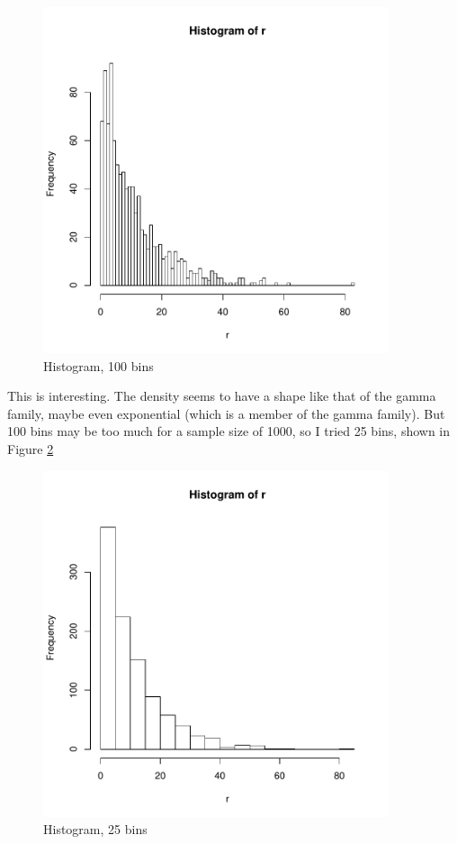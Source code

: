 \begin{figure}[tb] 
\centerline{
\includegraphics[width=4.0in]{Hist1.pdf} 
}
\caption{Histogram, 100 bins}
\label{h1} 
\end{figure}

This is interesting.  The density seems to have a shape like that of the
gamma family, maybe even exponential (which is a member of the gamma
family).  But 100 bins may be too much for a sample size of 1000, so I
tried 25 bins, shown in Figure \ref{h2}

\begin{figure}[tb] 
\centerline{
\includegraphics[width=4.0in]{Hist2.pdf}
}
\caption{Histogram, 25 bins}
\label{h2} 
\end{figure}

